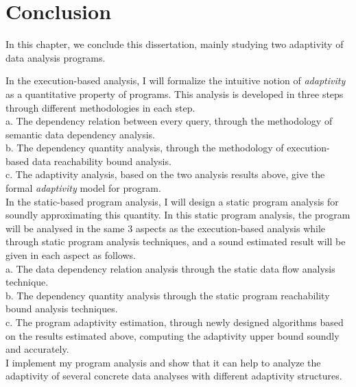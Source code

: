 \chapter{Conclusion}
\label{ch:conclusion}

In this chapter, we conclude this dissertation, mainly studying two adaptivity of data analysis programs.


In the execution-based analysis, I will formalize the intuitive notion of \emph{adaptivity} as a quantitative 
   property of programs. This analysis is developed in three steps through different methodologies in each step. 
   \\
	a. The dependency relation between every query, through the methodology of semantic data dependency analysis.
   \\
	b. The dependency quantity analysis, through the methodology of execution-based data reachability bound analysis.
   \\
	c. The adaptivity analysis, based on the two analysis results above, give the formal \emph{adaptivity} model 
   for program.
   \\   
	In the static-based program analysis, I will design a static program analysis for soundly approximating this quantity.
   In this static program analysis, the program will be analysed in the same 3 aspects as the execution-based analysis 
   while through static program analysis techniques, and a sound estimated result will be given in each aspect as follows.
   \\
	a. The data dependency relation analysis through the static data flow analysis technique.
   \\
	b. The dependency quantity analysis through the static program reachability bound analysis techniques.
   \\
	c. The program adaptivity estimation, through newly designed algorithms based on the results estimated above, 
   computing the adaptivity upper bound soundly 
   and accurately.
   \\
I implement my program analysis and show that it can help to analyze the adaptivity of several concrete data analyses with different adaptivity structures.

